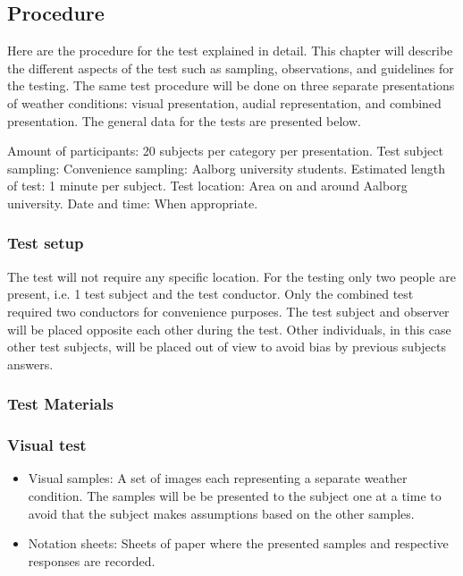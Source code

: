 \subsection{Procedure} %
\label{sub:procedure}

Here are the procedure for the test explained in detail. This chapter will describe the different aspects of the test such as sampling, observations, and guidelines for the testing. The same test procedure will be done on three separate presentations of weather conditions: visual presentation, audial representation, and combined presentation.
The general data for the tests are presented below.


Amount of participants: 20 subjects per category per presentation.
Test subject sampling: Convenience sampling: Aalborg university students.
Estimated length of test: 1 minute per subject.
Test location: Area on and around Aalborg university.
Date and time: When appropriate.


\subsubsection{Test setup} %
\label{ssub:test_setup}

The test will not require any specific location. 
For the testing only two people are present, i.e. 1 test subject and the test conductor. 
Only the combined test required two conductors for convenience purposes. The test subject and observer will be placed opposite each other during the test.
Other individuals, in this case other test subjects, will be placed out of view to avoid bias by previous subjects answers.



\subsubsection{Test Materials} %
\label{ssub:test_materials}

\subsubsection*{Visual test} %
\label{ssub:visual_test}

\begin{itemize}
    \item Visual samples: A set of images each representing a separate weather condition. The samples will be be presented to the subject one at a time to avoid that the subject makes assumptions based on the other samples.
    \item  Notation sheets: Sheets of paper where the presented samples and respective responses are recorded.
\end{itemize}

